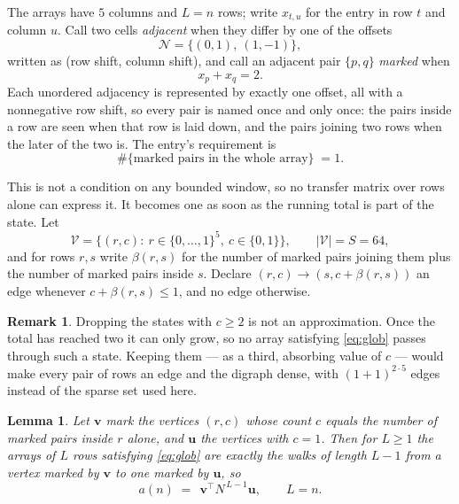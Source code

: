 \documentclass[11pt,a4paper]{article}
\theoremstyle{plain}
\newtheorem{lemma}[theorem]{Lemma}
\theoremstyle{definition}
\newtheorem{remark}[theorem]{Remark}
\begin{document}
The arrays have $5$ columns and $L=n$ rows; write $x_{t,u}$ for the entry in
row $t$ and column $u$. Call two cells \emph{adjacent} when they differ by one of the
offsets
\[
\mathcal N=\{(0,1),\ (1,-1)\},
\]
written as (row shift, column shift), and call an adjacent pair $\{p,q\}$
\emph{marked} when
\[
x_{p}+x_{q}=2 .
\]
Each unordered adjacency is represented by exactly one offset, all with a nonnegative row
shift, so every pair is named once and only once: the pairs inside a row are seen when
that row is laid down, and the pairs joining two rows when the later of the two is. The
entry's requirement is
\begin{equation}\label{eq:glob}
\#\{\text{marked pairs in the whole array}\}\;=1.
\end{equation}

This is not a condition on any bounded window, so no transfer matrix over rows alone can
express it. It becomes one as soon as the running total is part of the state. Let
\[
\mathcal V=\bigl\{(r,c):\ r\in\{0,\dots,1\}^{5},\ c\in\{0,1\}\bigr\},
\qquad |\mathcal V|=S=64,
\]
and for rows $r,s$ write $\beta(r,s)$ for the number of marked pairs joining them plus the
number of marked pairs inside $s$. Declare $(r,c)\to(s,c+\beta(r,s))$ an edge whenever
$c+\beta(r,s)\le1$, and no edge otherwise.

\begin{remark}
Dropping the states with $c\ge2$ is not an approximation. Once the total has reached two it
can only grow, so no array satisfying \eqref{eq:glob} passes through such a state. Keeping
them --- as a third, absorbing value of $c$ --- would make every pair of rows an edge and
the digraph dense, with $(1+1)^{2\cdot5}$ edges instead of the sparse set used here.
\end{remark}

\begin{lemma}\label{lem:walk}
Let $\mathbf{v}$ mark the vertices $(r,c)$ whose count $c$ equals the number of marked pairs
inside $r$ alone, and $\mathbf{u}$ the vertices with $c=1$. Then for $L\ge1$ the arrays
of $L$ rows satisfying \eqref{eq:glob} are exactly the walks of length $L-1$ from a
vertex marked by $\mathbf{v}$ to one marked by $\mathbf{u}$, so
\[
a(n)\;=\;\,\mathbf{v}^{\!\top}N^{\,L-1}\mathbf{u},\qquad L=n .
\]
\end{lemma}
\end{document}
